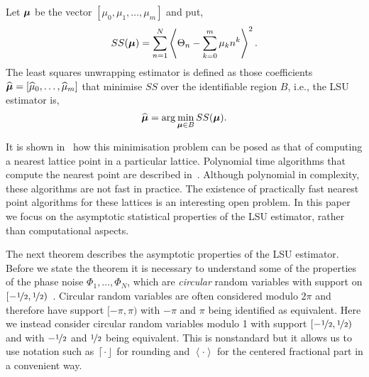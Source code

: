 \documentclass[aap]{imsart}
\newcommand{\fracpart}[1]{\left\langle #1 \right\rangle}
\newcommand{\round}[1]{{\left\lceil #1 \right\rfloor}}
\begin{document}
Let $\boldsymbol{\mu}$ be the vector $[\mu_0, \mu_1, \dots, \mu_m]$ and put,
\begin{equation} \label{eq:sumofsquaresfunction}
SS(\mubf) = \sum_{n=1}^{N}\fracpart{  \Theta_{n} - \sum_{k = 0}^{m}{\mu_k n^k} }^{2}.
\end{equation}
The least squares unwrapping estimator is defined as those coefficients $\widehat{\boldsymbol{\mu}} = [\widehat{\mu}_0, \dots, \widehat{\mu}_m]$ that minimise $SS$ over the identifiable region $B$, i.e., the LSU estimator is,
\begin{equation}\label{eq:hatmubfLSUdefn}
\widehat{\mubf} = \arg \min_{\mubf \in B} SS(\mubf). 
\end{equation}

It is shown in~\cite[Sec~8.1]{McKilliam2010thesis}\cite{McKilliam2009asilomar_polyest_lattice} how this minimisation problem can be posed as that of computing a nearest lattice point in a particular lattice. Polynomial time algorithms that compute the nearest point are described in~\cite[Sec.~4.3]{McKilliam2010thesis}.  Although polynomial in complexity, these algorithms are not fast in practice.  The existence of practically fast nearest point algorithms for these lattices is an interesting open problem.  In this paper we focus on the asymptotic statistical properties of the LSU estimator, rather than computational aspects.

The next theorem describes the asymptotic properties of the LSU estimator.  Before we state the theorem it is necessary to understand some of the properties of the phase noise $\Phi_1,\dots,\Phi_N$, which are \emph{circular} random variables with support on $[-\nicefrac{1}{2}, \nicefrac{1}{2})$~\cite{McKilliam2010thesis,McKilliam_mean_dir_est_sq_arc_length2010,Mardia_directional_statistics,Fisher1993}.  Circular random variables are often considered modulo $2\pi$ and therefore have support $[-\pi, \pi)$ with $-\pi$ and $\pi$ being identified as equivalent.  Here we instead consider circular random variables modulo 1 with support $[-\nicefrac{1}{2}, \nicefrac{1}{2})$ and with $-\nicefrac{1}{2}$ and $\nicefrac{1}{2}$ being equivalent.  This is nonstandard but it allows us to use notation such as $\round{\cdot}$ for rounding and $\fracpart{\cdot}$ for the centered fractional part in a convenient way.   %
\end{document}
